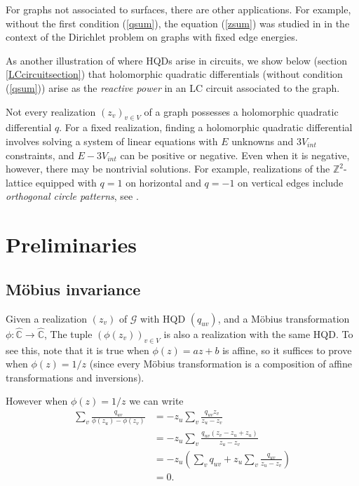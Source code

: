 \documentclass[12pt]{amsart}
\newcommand{\C}{{\mathbb C}}
\newcommand{\G}{{\mathcal G}}
\begin{document}
For graphs not associated to surfaces, there are other applications.
For example, without the first condition (\ref{qsum}), the equation (\ref{zsum}) was studied in \cite{Abrams2015}
in the context of the Dirichlet problem on graphs with fixed edge energies.

As another illustration of where HQDs arise in circuits, 
we show below (section \ref{LCcircuitsection}) that holomorphic quadratic differentials (without condition (\ref{qsum}))
arise as the \emph{reactive power} in an LC circuit associated to the graph.

Not every realization $(z_v)_{v\in V}$ of a graph possesses a holomorphic quadratic differential $q$. 
For a fixed realization, finding a holomorphic quadratic differential involves solving a system of linear equations with $E$ unknowns and $3V_{int}$ constraints, and $E-3V_{int}$ can be positive or negative.
Even when it is negative, however, there may be nontrivial solutions. For example, 
realizations of the $\mathbb{Z}^2$-lattice equipped with $q=1$ on horizontal and $q=-1$ on vertical edges include \emph{orthogonal circle patterns}, see \cite{Bobenko1999}. 



\section{Preliminaries}

\subsection{M\"obius invariance}\label{Mobius}
Given a realization $(z_v)$ of $\G$ with HQD $(q_{uv})$, and a M\"obius transformation $\phi:\hat\C\to\hat\C$,
The tuple $(\phi(z_v))_{v\in V}$ is also a realization with the same HQD. To see this,
note that it is true when $\phi(z) = az+b$ is affine, so it suffices to prove when $\phi(z)=1/z$ (since every M\"obius
transformation is a composition of affine transformations and inversions).

However when $\phi(z)=1/z$ we can write 
\begin{align*}\sum_v\frac{q_{uv}}{\phi(z_u)-\phi(z_v)}&=-z_u\sum_v\frac{q_{uv}z_v}{z_u-z_v}\\
&=-z_u\sum_v\frac{q_{uv}(z_v-z_u+z_u)}{z_u-z_v}\\
&=-z_u\left(\sum_v q_{uv} + z_u\sum_v\frac{q_{uv}}{z_u-z_v}\right)\\
&=0.\end{align*}
\end{document}
